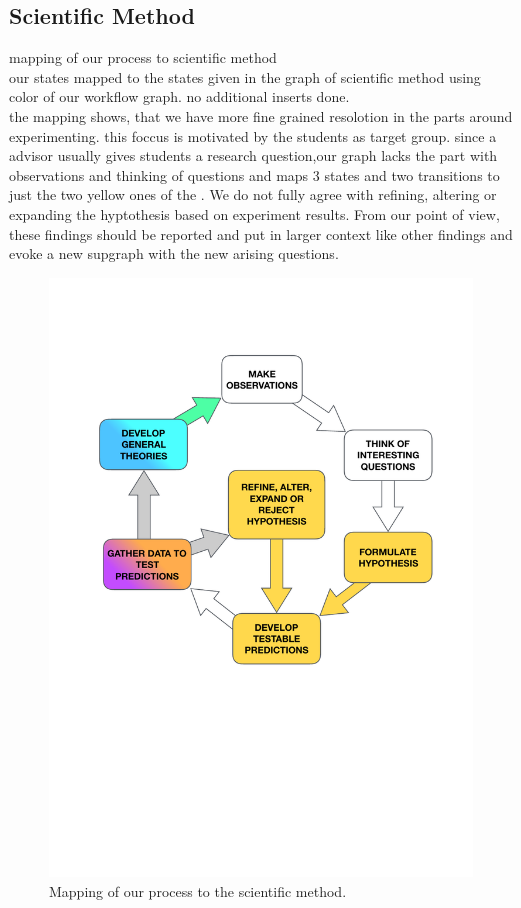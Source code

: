 
\subsection {Scientific Method}
\label{subsec:scientific method}

mapping of our process to scientific method\\
our states mapped to the states given in the graph of scientific method using color of our workflow graph. no additional inserts done.\\
the mapping shows, that we have more fine grained resolotion in the parts around experimenting. this foccus is motivated by the students as target group.
since a advisor usually gives students a research question,our graph lacks the part with observations and thinking of questions and maps 3 states and two transitions to just the two yellow ones of the \checklist.
We do not fully agree with refining, altering or expanding the hyptothesis based on experiment results. From our point of view, these findings should be reported and put in larger context like other findings and evoke a new supgraph with the new arising questions.

\begin{figure}
	\centering
	\includegraphics[width=12cm]{figures/scientific_method_mapping.pdf}
	\caption{Mapping of our process to the scientific method. }
	\label{fig:PICOT_FINER}
\end{figure}

